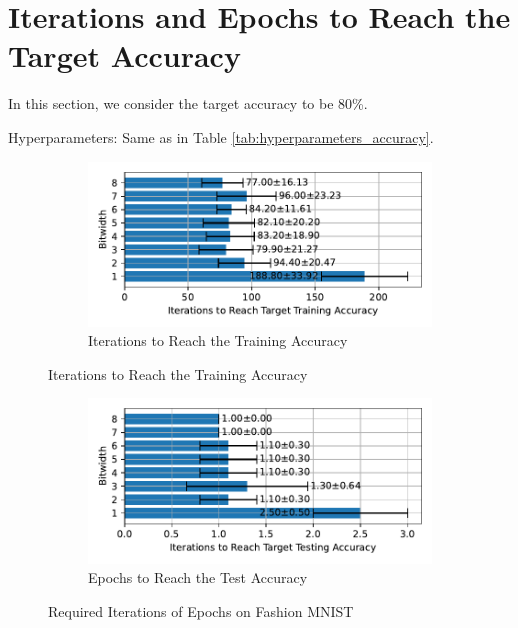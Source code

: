 \section{Iterations and Epochs to Reach the Target Accuracy}
\label{appendix:iterations}
    In this section, we consider the target accuracy to be 80\%. 

    Hyperparameters: Same as in Table \ref{tab:hyperparameters_accuracy}.

    \label{appendix:iterations_fashion_mnist}
        \begin{figure}[H]
            \centering
            \begin{subfigure}[H]{0.6\textwidth}
                \centering
                \includegraphics[width=\textwidth]{../standard/FashionMNIST/plots/fashionmnist_train_iters_horizontal.pdf}
                \caption{Iterations to Reach the Training Accuracy}
            \end{subfigure}
        \end{figure}
        \begin{figure}[H]
            \centering
            \ContinuedFloat
            \begin{subfigure}[H]{0.6\textwidth}
                \centering
                \includegraphics[width=\textwidth]{../standard/FashionMNIST/plots/fashionmnist_test_iters_horizontal.pdf}
                \caption{Epochs to Reach the Test Accuracy}
            \end{subfigure}
            \caption{Required Iterations of Epochs on Fashion MNIST}
        \end{figure}

